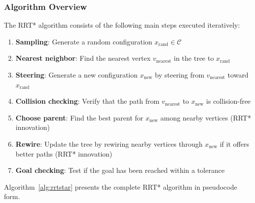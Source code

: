 \documentclass[11pt]{article}
\newcommand{\C}{\mathcal{C}}
\newcommand{\vnearest}{v_{\text{nearest}}}
\newcommand{\xrand}{x_{\text{rand}}}
\newcommand{\xnew}{x_{\text{new}}}
\begin{document}
\subsubsection{Algorithm Overview}

The RRT* algorithm consists of the following main steps executed iteratively:

\begin{enumerate}[noitemsep]
	\item \textbf{Sampling}: Generate a random configuration $\xrand \in \C$
	\item \textbf{Nearest neighbor}: Find the nearest vertex $\vnearest$ in the tree to $\xrand$
	\item \textbf{Steering}: Generate a new configuration $\xnew$ by steering from $\vnearest$ toward $\xrand$
	\item \textbf{Collision checking}: Verify that the path from $\vnearest$ to $\xnew$ is collision-free
	\item \textbf{Choose parent}: Find the best parent for $\xnew$ among nearby vertices (RRT* innovation)
	\item \textbf{Rewire}: Update the tree by rewiring nearby vertices through $\xnew$ if it offers better paths (RRT* innovation)
	\item \textbf{Goal checking}: Test if the goal has been reached within a tolerance
\end{enumerate}

Algorithm~\ref{alg:rrtstar} presents the complete RRT* algorithm in pseudocode form.
\end{document}
